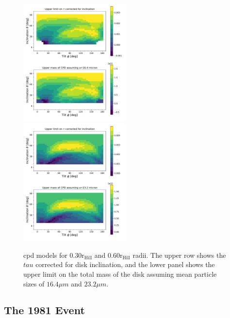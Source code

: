 \documentclass[longauth]{aa} %
\newcommand{\rhill}{$\mathrm{r_{Hill}}$} %
\begin{document}
\begin{figure}[htb]       
    \includegraphics[width=0.50\textwidth]{diskfit_taumass_030.pdf}   
    \includegraphics[width=0.50\textwidth]{diskfit_taumass_060.pdf}
    \caption{\ac{cpd} models for 0.30\rhill{} and  0.60\rhill{} radii. The upper row shows the $tau$ corrected for disk inclination, and the lower panel shows the upper limit on the total mass of the disk assuming mean particle sizes of $16.4\mu m$ and $23.2\mu m$.}
    \label{totalcpd}
\end{figure}


\subsection{The 1981 Event}
\end{document}
